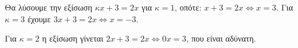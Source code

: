 
\begin{alist}
\item Θα λύσουμε την εξίσωση $\kappa x + 3 = 2x$ για $\kappa = 1$, οπότε: $x + 3 = 2x \Leftrightarrow x = 3$.
Για $\kappa = 3$ έχουμε $3x + 3 = 2x \Leftrightarrow x = -3$.

\item Για $\kappa = 2$ η εξίσωση γίνεται $2x + 3 = 2x \Leftrightarrow 0x = 3$, που είναι αδύνατη.
\end{alist}

